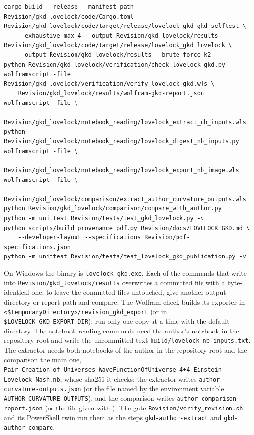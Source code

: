 \documentclass[11pt]{article}
\begin{document}
\begin{Verbatim}[fontsize=\small]
cargo build --release --manifest-path Revision/gkd_lovelock/code/Cargo.toml
Revision/gkd_lovelock/code/target/release/lovelock_gkd gkd-selftest \
    --exhaustive-max 4 --output Revision/gkd_lovelock/results
Revision/gkd_lovelock/code/target/release/lovelock_gkd lovelock \
    --output Revision/gkd_lovelock/results --brute-force-k2
python Revision/gkd_lovelock/verification/check_lovelock_gkd.py
wolframscript -file Revision/gkd_lovelock/verification/verify_lovelock_gkd.wls \
    Revision/gkd_lovelock/results/wolfram-gkd-report.json
wolframscript -file \
    Revision/gkd_lovelock/notebook_reading/lovelock_extract_nb_inputs.wls
python Revision/gkd_lovelock/notebook_reading/lovelock_digest_nb_inputs.py
wolframscript -file \
    Revision/gkd_lovelock/notebook_reading/lovelock_export_nb_image.wls
wolframscript -file \
    Revision/gkd_lovelock/comparison/extract_author_curvature_outputs.wls
python Revision/gkd_lovelock/comparison/compare_with_author.py
python -m unittest Revision/tests/test_gkd_lovelock.py -v
python scripts/build_provenance_pdf.py Revision/docs/LOVELOCK_GKD.md \
    --developer-layout --specifications Revision/pdf-specifications.json
python -m unittest Revision/tests/test_lovelock_gkd_publication.py -v
\end{Verbatim}

On Windows the binary is \texttt{lovelock\allowbreak{}\_gkd.exe}. Each of the commands that write into \texttt{Revision\allowbreak{}/gkd\_lov\allowbreak{}elock/re\allowbreak{}sults} overwrites a committed file with a byte-identical one; to leave the committed files untouched, give another output directory or report path and compare. The Wolfram check builds its exporter in \texttt{<\$Tempor\allowbreak{}aryDirec\allowbreak{}tory>/re\allowbreak{}vision\_g\allowbreak{}kd\_expor\allowbreak{}t} (or in \texttt{\$LOVELOC\allowbreak{}K\_GKD\_EX\allowbreak{}PORT\_DIR}); run only one copy at a time with the default directory. The notebook-reading commands need the author's notebook in the repository root and write the uncommitted text \texttt{build/lo\allowbreak{}velock\_n\allowbreak{}b\_inputs\allowbreak{}.txt}. The extractor needs both notebooks of the author in the repository root and the comparison the main one, \texttt{Pair\_Cre\allowbreak{}ation\_of\allowbreak{}\_Univers\allowbreak{}es\_WaveF\allowbreak{}unctionO\allowbreak{}fUnivers\allowbreak{}e-4+4-Ei\allowbreak{}nstein-L\allowbreak{}ovelock-\allowbreak{}Nash.nb}, whose sha256 it checks; the extractor writes \texttt{author-c\allowbreak{}urvature\allowbreak{}-outputs\allowbreak{}.json} (or the file named by the environment variable \texttt{AUTHOR\_C\allowbreak{}URVATURE\allowbreak{}\_OUTPUTS}), and the comparison writes \texttt{author-c\allowbreak{}ompariso\allowbreak{}n-report\allowbreak{}.json} (or the file given with \texttt{}). The gate \texttt{Revision\allowbreak{}/verify\_\allowbreak{}revision\allowbreak{}.sh} and its PowerShell twin run them as the steps \texttt{gkd-auth\allowbreak{}or-extra\allowbreak{}ct} and \texttt{gkd-auth\allowbreak{}or-compa\allowbreak{}re}.
\end{document}
